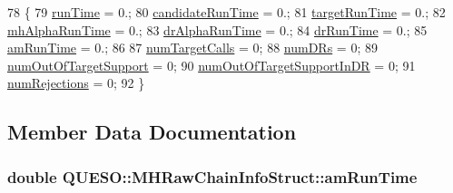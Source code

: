 \begin{DoxyCode}
78 \{
79   \hyperlink{struct_q_u_e_s_o_1_1_m_h_raw_chain_info_struct_a5b36b9734f0b40d54cfd4c58c18c9b45}{runTime}          = 0.;
80   \hyperlink{struct_q_u_e_s_o_1_1_m_h_raw_chain_info_struct_ada3a9649c975062a366df63561c599c7}{candidateRunTime} = 0.;
81   \hyperlink{struct_q_u_e_s_o_1_1_m_h_raw_chain_info_struct_ab230db8f99e46f0c1e4fc6c2aa3773eb}{targetRunTime}    = 0.;
82   \hyperlink{struct_q_u_e_s_o_1_1_m_h_raw_chain_info_struct_a16d5d703c764352dfe30dfaa25ce8b8b}{mhAlphaRunTime}   = 0.;
83   \hyperlink{struct_q_u_e_s_o_1_1_m_h_raw_chain_info_struct_afa74a9d74fc3e7942012b8d8448f6687}{drAlphaRunTime}   = 0.;
84   \hyperlink{struct_q_u_e_s_o_1_1_m_h_raw_chain_info_struct_acd15a61993f122a3780dfae6f096d9b9}{drRunTime}        = 0.;
85   \hyperlink{struct_q_u_e_s_o_1_1_m_h_raw_chain_info_struct_a0ea7cbad553a5f79c1e1c89b25bc8cde}{amRunTime}        = 0.;
86 
87   \hyperlink{struct_q_u_e_s_o_1_1_m_h_raw_chain_info_struct_a506e08bdffc1f777e33c7ec2d7862747}{numTargetCalls}            = 0;
88   \hyperlink{struct_q_u_e_s_o_1_1_m_h_raw_chain_info_struct_a993b070bd796dd176f4168be05f11ce9}{numDRs}                    = 0;
89   \hyperlink{struct_q_u_e_s_o_1_1_m_h_raw_chain_info_struct_a601f798ee4dc28cfa6b342fc04a8c841}{numOutOfTargetSupport}     = 0;
90   \hyperlink{struct_q_u_e_s_o_1_1_m_h_raw_chain_info_struct_a783bb6c6b6dcab7f2bcc9fd0f49c588f}{numOutOfTargetSupportInDR} = 0;
91   \hyperlink{struct_q_u_e_s_o_1_1_m_h_raw_chain_info_struct_a276f608de19910713df01124a971c79c}{numRejections}             = 0;
92 \}
\end{DoxyCode}


\subsection{Member Data Documentation}
\hypertarget{struct_q_u_e_s_o_1_1_m_h_raw_chain_info_struct_a0ea7cbad553a5f79c1e1c89b25bc8cde}{
\subsubsection[{am\-Run\-Time}]{\setlength{\rightskip}{0pt plus 5cm}double Q\-U\-E\-S\-O\-::\-M\-H\-Raw\-Chain\-Info\-Struct\-::am\-Run\-Time}}\label{struct_q_u_e_s_o_1_1_m_h_raw_chain_info_struct_a0ea7cbad553a5f79c1e1c89b25bc8cde}


